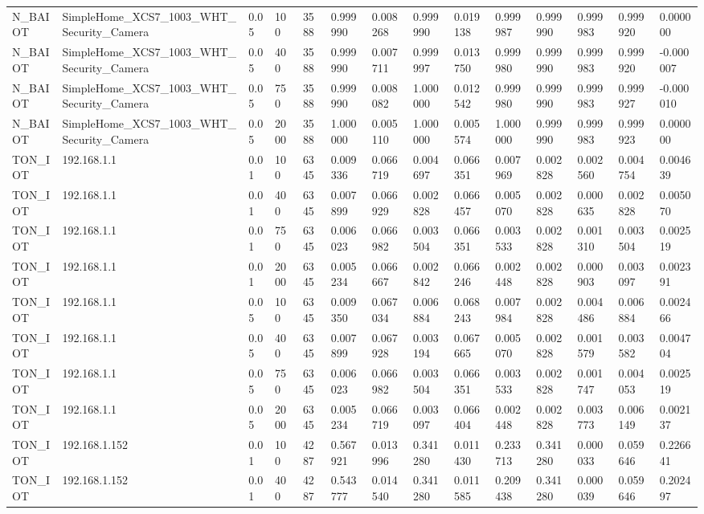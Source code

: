 \begin{tabular}{llllllllllllll}
N\_BAIOT & SimpleHome\_XCS7\_1003\_WHT\_Security\_Camera & 0.05 & 100 & 3588 & 0.999990 & 0.008268 & 0.999990 & 0.019138 & 0.999987 & 0.999990 & 0.999983 & 0.999920 & 0.000000 \\
N\_BAIOT & SimpleHome\_XCS7\_1003\_WHT\_Security\_Camera & 0.05 & 400 & 3588 & 0.999990 & 0.007711 & 0.999997 & 0.013750 & 0.999980 & 0.999990 & 0.999983 & 0.999920 & -0.000007 \\
N\_BAIOT & SimpleHome\_XCS7\_1003\_WHT\_Security\_Camera & 0.05 & 750 & 3588 & 0.999990 & 0.008082 & 1.000000 & 0.012542 & 0.999980 & 0.999990 & 0.999983 & 0.999927 & -0.000010 \\
N\_BAIOT & SimpleHome\_XCS7\_1003\_WHT\_Security\_Camera & 0.05 & 2000 & 3588 & 1.000000 & 0.005110 & 1.000000 & 0.005574 & 1.000000 & 0.999990 & 0.999983 & 0.999923 & 0.000000 \\
TON\_IOT & 192.168.1.1 & 0.01 & 100 & 6345 & 0.009336 & 0.066719 & 0.004697 & 0.066351 & 0.007969 & 0.002828 & 0.002560 & 0.004754 & 0.004639 \\
TON\_IOT & 192.168.1.1 & 0.01 & 400 & 6345 & 0.007899 & 0.066929 & 0.002828 & 0.066457 & 0.005070 & 0.002828 & 0.000635 & 0.002828 & 0.005070 \\
TON\_IOT & 192.168.1.1 & 0.01 & 750 & 6345 & 0.006023 & 0.066982 & 0.003504 & 0.066351 & 0.003533 & 0.002828 & 0.001310 & 0.003504 & 0.002519 \\
TON\_IOT & 192.168.1.1 & 0.01 & 2000 & 6345 & 0.005234 & 0.066667 & 0.002842 & 0.066246 & 0.002448 & 0.002828 & 0.000903 & 0.003097 & 0.002391 \\
TON\_IOT & 192.168.1.1 & 0.05 & 100 & 6345 & 0.009350 & 0.067034 & 0.006884 & 0.068243 & 0.007984 & 0.002828 & 0.004486 & 0.006884 & 0.002466 \\
TON\_IOT & 192.168.1.1 & 0.05 & 400 & 6345 & 0.007899 & 0.067928 & 0.003194 & 0.067665 & 0.005070 & 0.002828 & 0.001579 & 0.003582 & 0.004704 \\
TON\_IOT & 192.168.1.1 & 0.05 & 750 & 6345 & 0.006023 & 0.066982 & 0.003504 & 0.066351 & 0.003533 & 0.002828 & 0.001747 & 0.004053 & 0.002519 \\
TON\_IOT & 192.168.1.1 & 0.05 & 2000 & 6345 & 0.005234 & 0.066719 & 0.003097 & 0.066404 & 0.002448 & 0.002828 & 0.003773 & 0.006149 & 0.002137 \\
TON\_IOT & 192.168.1.152 & 0.01 & 100 & 4287 & 0.567921 & 0.013996 & 0.341280 & 0.011430 & 0.233713 & 0.341280 & 0.000033 & 0.059646 & 0.226641 \\
TON\_IOT & 192.168.1.152 & 0.01 & 400 & 4287 & 0.543777 & 0.014540 & 0.341280 & 0.011585 & 0.209438 & 0.341280 & 0.000039 & 0.059646 & 0.202497 \\

\end{tabular}

